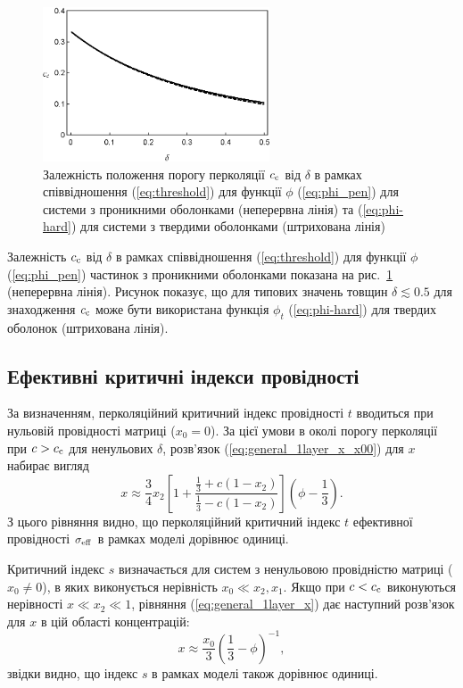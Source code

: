 \documentclass[14pt,twoside]{vakthesis}
\begin{document}
\begin{figure}[tb]
	\centering
	\includegraphics[width=0.6\textwidth]{threshold-delta.eps}
	\caption{\label{fig:threshold-delta}
		Залежність положення порогу перколяції $c_{\rm c}$ від $\delta$ в рамках співвідношення (\ref{eq:threshold}) для функції $\phi$ (\ref{eq:phi_pen}) для системи з проникними оболонками (неперервна лінія) та (\ref{eq:phi-hard}) для системи з твердими оболонками (штрихована лінія)}
\end{figure}

Залежність $c_{\rm c}$ від $\delta$ в рамках співвідношення (\ref{eq:threshold}) для функції $\phi$ (\ref{eq:phi_pen}) частинок з проникними оболонками показана на рис.~\ref{fig:threshold-delta}  (неперервна лінія). Рисунок показує, що для типових значень товщин $\delta \lesssim 0.5$ для знаходження $c_{\rm c}$ може бути використана функція $\phi_t$  (\ref{eq:phi-hard}) для твердих оболонок (штрихована лінія).


\subsection{Ефективні критичні індекси провідності}

За визначенням, перколяційний критичний індекс провідності $t$ вводиться при нульовій провідності матриці ($x_0 = 0$). За цієї умови в околі порогу перколяції при $c > c_{\rm c}$ для ненульових $\delta$, розв'язок (\ref{eq:general_1layer_x_x00}) для $x$  набирає вигляд
\begin{equation}\label{eq:general_1layer_x_x00_cc}
x \approx \frac{3}{4} x_2 \left[ 1 + \frac{\frac{1}{3} + c(1 - x_2)}{\frac{1}{3} - c(1 - x_2)} \right] \left( \phi - \frac{1}{3} \right).
\end{equation}
З цього рівняння видно, що перколяційний критичний індекс $t$ ефективної провідності $\sigma_{\rm eff}$ в рамках моделі дорівнює одиниці. 

Критичний індекс $s$ визначається для систем з ненульовою провідністю матриці ($x_0 \neq 0$), в яких виконується нерівність $x_0\ll x_2, x_1$. 
Якщо при $c<c_{\rm c}$ виконуються нерівності $x\ll x_2\ll 1$, рівняння (\ref{eq:general_1layer_x}) дає наступний розв'язок для $x$ в цій області концентрацій:
\begin{equation}\label{eq:general_1layer_x_x00_cc_s}
x \approx \frac{x_0}{3} \left( \frac{1}{3} - \phi \right)^{-1},
\end{equation}
звідки видно, що індекс $s$ в рамках моделі також дорівнює одиниці.
\end{document}
